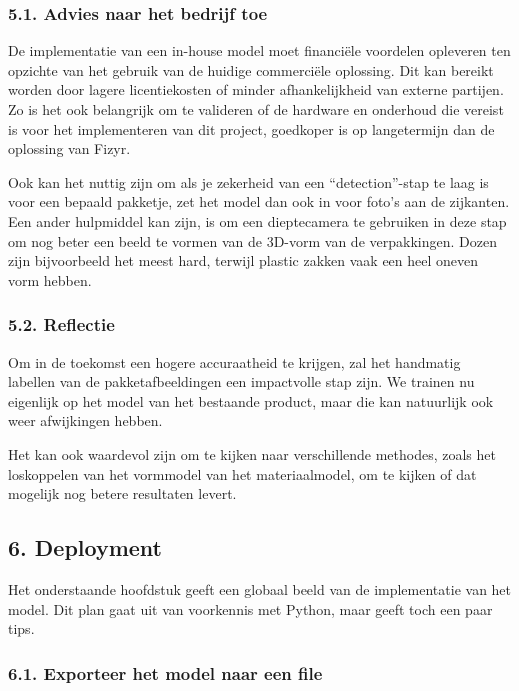 \documentclass[11pt]{article}
\begin{document}
\subsubsection{5.1. Advies naar het bedrijf
toe}\label{advies-naar-het-bedrijf-toe}

De implementatie van een in-house model moet financiële voordelen
opleveren ten opzichte van het gebruik van de huidige commerciële
oplossing. Dit kan bereikt worden door lagere licentiekosten of minder
afhankelijkheid van externe partijen. Zo is het ook belangrijk om te
valideren of de hardware en onderhoud die vereist is voor het
implementeren van dit project, goedkoper is op langetermijn dan de
oplossing van Fizyr.

Ook kan het nuttig zijn om als je zekerheid van een ``detection''-stap
te laag is voor een bepaald pakketje, zet het model dan ook in voor
foto's aan de zijkanten. Een ander hulpmiddel kan zijn, is om een
dieptecamera te gebruiken in deze stap om nog beter een beeld te vormen
van de 3D-vorm van de verpakkingen. Dozen zijn bijvoorbeeld het meest
hard, terwijl plastic zakken vaak een heel oneven vorm hebben.

\subsubsection{5.2. Reflectie}\label{reflectie}

Om in de toekomst een hogere accuraatheid te krijgen, zal het handmatig
labellen van de pakketafbeeldingen een impactvolle stap zijn. We trainen
nu eigenlijk op het model van het bestaande product, maar die kan
natuurlijk ook weer afwijkingen hebben.

Het kan ook waardevol zijn om te kijken naar verschillende methodes,
zoals het loskoppelen van het vormmodel van het materiaalmodel, om te
kijken of dat mogelijk nog betere resultaten levert.

    \subsection{6. Deployment}\label{deployment}

Het onderstaande hoofdstuk geeft een globaal beeld van de implementatie
van het model. Dit plan gaat uit van voorkennis met Python, maar geeft
toch een paar tips.

\subsubsection{6.1. Exporteer het model naar een
file}\label{exporteer-het-model-naar-een-file}
\end{document}
